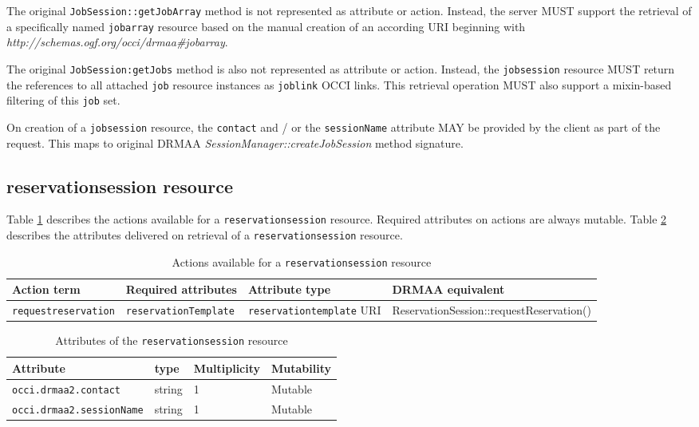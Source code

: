 \documentclass[10pt]{article}
\newcommand{\h}[1]{\lstinline|#1|}
\begin{document}
The original \h{JobSession::getJobArray} method is not represented as attribute or action. Instead, the server MUST support the retrieval of a specifically named \h{jobarray} resource based on the manual creation of an according URI beginning with \emph{http://schemas.ogf.org/occi/drmaa\#jobarray}. 

The original \h{JobSession:getJobs} method is also not represented as attribute or action. Instead, the \h{jobsession} resource MUST return the references to all attached \h{job} resource instances as \h{joblink} OCCI links. This retrieval operation MUST also support a mixin-based filtering of this \h{job} set. 

On creation of a \h{jobsession} resource, the \h{contact} and / or the \h{sessionName} attribute MAY be provided by the client as part of the request. This maps to original DRMAA \emph{SessionManager::createJobSession} method signature.


\subsection{reservationsession resource}

Table \ref{tab:reservationsessionactions} describes the actions available for a \h{reservationsession} resource. Required attributes on actions are always mutable. Table \ref{tab:reservationsessionattributes} describes the attributes delivered on retrieval of a \h{reservationsession} resource.

\begin{table}[ht]
\centering
\begin{tabularx}{\textwidth}{|X|X|X|X|}
\hline
Action term            & Required attributes     & Attribute type              & DRMAA equivalent  \\
\hline
\h{requestreservation} & \h{reservationTemplate} & \h{reservationtemplate} URI &  ReservationSession::requestReservation() \\
\hline
\end{tabularx}
\caption{Actions available for a \h{reservationsession} resource}
\label{tab:reservationsessionactions}
\end{table}

\begin{table}[ht]
\centering
\begin{tabularx}{\textwidth}{|l|X|X|X|}
\hline
Attribute       & type   & Multiplicity & Mutability \\
\hline
\h{occi.drmaa2.contact}     & string       & 1            & Mutable    \\ %
\h{occi.drmaa2.sessionName} & string       & 1            & Mutable    \\ %
\hline
\end{tabularx}
\caption{Attributes of the \h{reservationsession} resource}
\label{tab:reservationsessionattributes}
\end{table}
\end{document}
